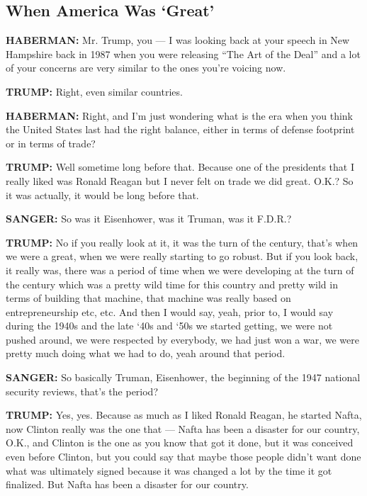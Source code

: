 \hypertarget{when-america-was-great}{%
\subsection{When America Was `Great'}\label{when-america-was-great}}

\textbf{HABERMAN:} Mr. Trump, you --- I was looking back at your speech
in New Hampshire back in 1987 when you were releasing ``The Art of the
Deal'' and a lot of your concerns are very similar to the ones you're
voicing now.

\textbf{TRUMP:} Right, even similar countries.

\textbf{HABERMAN:} Right, and I'm just wondering what is the era when
you think the United States last had the right balance, either in terms
of defense footprint or in terms of trade?

\textbf{TRUMP:} Well sometime long before that. Because one of the
presidents that I really liked was Ronald Reagan but I never felt on
trade we did great. O.K.? So it was actually, it would be long before
that.

\textbf{SANGER:} So was it Eisenhower, was it Truman, was it F.D.R.?

\textbf{TRUMP:} No if you really look at it, it was the turn of the
century, that's when we were a great, when we were really starting to go
robust. But if you look back, it really was, there was a period of time
when we were developing at the turn of the century which was a pretty
wild time for this country and pretty wild in terms of building that
machine, that machine was really based on entrepreneurship etc, etc. And
then I would say, yeah, prior to, I would say during the 1940s and the
late `40s and `50s we started getting, we were not pushed around, we
were respected by everybody, we had just won a war, we were pretty much
doing what we had to do, yeah around that period.

\textbf{SANGER:} So basically Truman, Eisenhower, the beginning of the
1947 national security reviews, that's the period?

\textbf{TRUMP:} Yes, yes. Because as much as I liked Ronald Reagan, he
started Nafta, now Clinton really was the one that --- Nafta has been a
disaster for our country, O.K., and Clinton is the one as you know that
got it done, but it was conceived even before Clinton, but you could say
that maybe those people didn't want done what was ultimately signed
because it was changed a lot by the time it got finalized. But Nafta has
been a disaster for our country.

